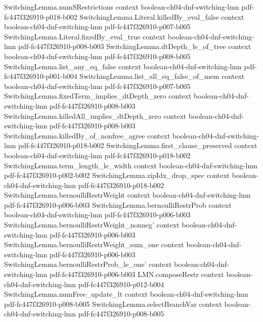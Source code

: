 \begin{lemma}
\proofstep
  {SwitchingLemma.numSRestrictions}
  {context}
  {boolean-ch04-dnf-switching-lmn}
  {pdf-fc447f326910-p018-b002}
\proofstep
  {SwitchingLemma.Literal.killedBy_eval_false}
  {context}
  {boolean-ch04-dnf-switching-lmn}
  {pdf-fc447f326910-p007-b005}
\proofstep
  {SwitchingLemma.Literal.fixedBy_eval_true}
  {context}
  {boolean-ch04-dnf-switching-lmn}
  {pdf-fc447f326910-p008-b003}
\proofstep
  {SwitchingLemma.dtDepth_le_of_tree}
  {context}
  {boolean-ch04-dnf-switching-lmn}
  {pdf-fc447f326910-p008-b005}
\proofstep
  {SwitchingLemma.list_any_eq_false}
  {context}
  {boolean-ch04-dnf-switching-lmn}
  {pdf-fc447f326910-p001-b004}
\proofstep
  {SwitchingLemma.list_all_eq_false_of_mem}
  {context}
  {boolean-ch04-dnf-switching-lmn}
  {pdf-fc447f326910-p007-b005}
\proofstep
  {SwitchingLemma.fixedTerm_implies_dtDepth_zero}
  {context}
  {boolean-ch04-dnf-switching-lmn}
  {pdf-fc447f326910-p008-b003}
\proofstep
  {SwitchingLemma.killedAll_implies_dtDepth_zero}
  {context}
  {boolean-ch04-dnf-switching-lmn}
  {pdf-fc447f326910-p008-b003}
\proofstep
  {SwitchingLemma.killedBy_of_nonfree_agree}
  {context}
  {boolean-ch04-dnf-switching-lmn}
  {pdf-fc447f326910-p018-b002}
\proofstep
  {SwitchingLemma.first_clause_preserved}
  {context}
  {boolean-ch04-dnf-switching-lmn}
  {pdf-fc447f326910-p018-b002}
\proofstep
  {SwitchingLemma.term_length_le_width}
  {context}
  {boolean-ch04-dnf-switching-lmn}
  {pdf-fc447f326910-p002-b002}
\proofstep
  {SwitchingLemma.zipIdx_drop_spec}
  {context}
  {boolean-ch04-dnf-switching-lmn}
  {pdf-fc447f326910-p018-b002}
\proofstep
  {SwitchingLemma.bernoulliRestrWeight}
  {context}
  {boolean-ch04-dnf-switching-lmn}
  {pdf-fc447f326910-p006-b003}
\proofstep
  {SwitchingLemma.bernoulliRestrProb}
  {context}
  {boolean-ch04-dnf-switching-lmn}
  {pdf-fc447f326910-p006-b003}
\proofstep
  {SwitchingLemma.bernoulliRestrWeight_nonneg'}
  {context}
  {boolean-ch04-dnf-switching-lmn}
  {pdf-fc447f326910-p006-b003}
\proofstep
  {SwitchingLemma.bernoulliRestrWeight_sum_one}
  {context}
  {boolean-ch04-dnf-switching-lmn}
  {pdf-fc447f326910-p006-b003}
\proofstep
  {SwitchingLemma.bernoulliRestrProb_le_one'}
  {context}
  {boolean-ch04-dnf-switching-lmn}
  {pdf-fc447f326910-p006-b003}
\proofstep
  {LMN.composeRestr}
  {context}
  {boolean-ch04-dnf-switching-lmn}
  {pdf-fc447f326910-p012-b004}
\proofstep
  {SwitchingLemma.numFree_update_lt}
  {context}
  {boolean-ch04-dnf-switching-lmn}
  {pdf-fc447f326910-p008-b005}
\proofstep
  {SwitchingLemma.selectBranchVar}
  {context}
  {boolean-ch04-dnf-switching-lmn}
  {pdf-fc447f326910-p008-b005}

\end{lemma}
